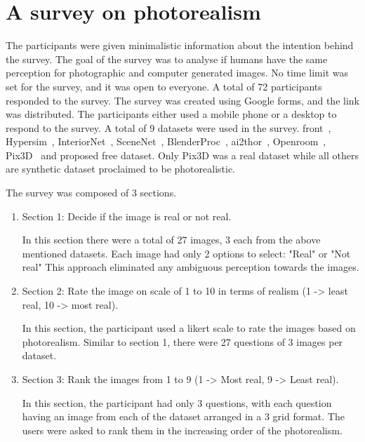 \section{A survey on photorealism}\label{sec:a-survey-on-photorealism}

The participants were given minimalistic information about the intention behind the survey.
The goal of the survey was to analyse if humans have the same perception for photographic and computer generated images.
No time limit was set for the survey, and it was open to everyone.
A total of 72 participants responded to the survey.
The survey was created using Google forms, and the link was distributed.
The participants either used a mobile phone or a desktop to respond to the survey.
A total of 9 datasets were used in the survey.
\gls{front}~\cite{Fu20203DFRONT3F}, Hypersim~\cite{Roberts2020HypersimAP}, InteriorNet~\cite{InteriorNet18}, SceneNet~\cite{McCormac:etal:ICCV2017}, BlenderProc~\cite{denninger2019blenderproc},
\gls{ai2thor}~\cite{kolve2019ai2thor}, Openroom~\cite{li2021openrooms}, Pix3D~\cite{pix3d} and proposed \gls{free} dataset.
Only Pix3D was a real dataset while all others are synthetic dataset proclaimed to be photorealistic.

The survey was composed of 3 sections.
\begin{enumerate}
    \item Section 1: Decide if the image is real or not real.

    In this section there were a total of 27 images, 3 each from the above mentioned datasets.
    Each image had only 2 options to select: "Real" or "Not real"
    This approach eliminated any ambiguous perception towards the images.

    \item Section 2: Rate the image on scale of 1 to 10 in terms of realism (1 -> least real, 10 -> most real).

    In this section, the participant used a likert scale to rate the images based on photorealism.
    Similar to section 1, there were 27 questions of 3 images per dataset.

    \item Section 3: Rank the images from 1 to 9 (1 -> Most real, 9 -> Least real).

    In this section, the participant had only 3 questions, with each question having an image from each of the dataset arranged in a 3 grid format.
    The users were asked to rank them in the increasing order of the photorealism.
\end{enumerate}

